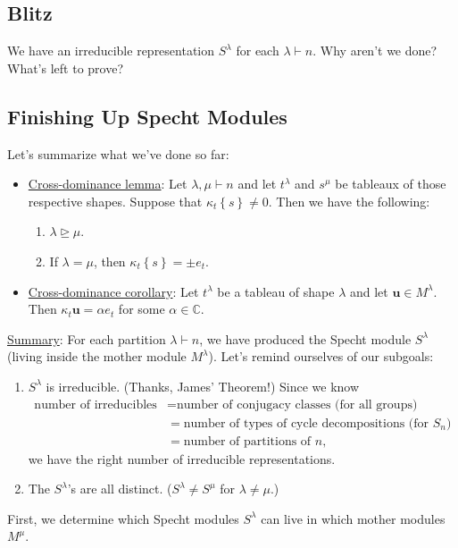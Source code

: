 \documentclass[12pt]{article}
\newcommand{\cx}{\mathbb{C}}
\newcommand\setb[1]{\left \{ #1 \right \}}
\theoremstyle{definition}
\begin{document}
\subsection{Blitz}
We have an irreducible representation $S^{\lambda}$ for each $\lambda \vdash n$. Why aren't we done? What's left to prove?
\subsection{Finishing Up Specht Modules}
Let's summarize what we've done so far:
\begin{itemize}
    \item \underline{Cross-dominance lemma}: Let $\lambda , \mu \vdash n$ and let $t^{\lambda}$ and $s^{\mu}$ be tableaux of those respective shapes. Suppose that $\kappa_t \setb{ s } \neq 0$. Then we have the following:
    \begin{enumerate}
        \item $\lambda \trianglerighteq \mu$.
        \item If $\lambda = \mu$, then $\kappa_t \setb{ s } = \pm e_t$.
    \end{enumerate}
    \item \underline{Cross-dominance corollary}: Let $t^{\lambda}$ be a tableau of shape $\lambda$ and let $\mathbf{u} \in M^{\lambda}$. Then $\kappa_t \mathbf{u} = \alpha e_t$ for some $\alpha \in \cx$.
\end{itemize}
\noindent \underline{Summary}: For each partition $\lambda \vdash n$, we have produced the Specht module $S^{\lambda}$ (living inside the mother module $M^{\lambda}$). Let's remind ourselves of our subgoals:
\begin{enumerate}
    \item $S^{\lambda}$ is irreducible. (Thanks, James' Theorem!) Since we know
    \begin{align*}
        \text{number of irreducibles} & = \text{number of conjugacy classes (for all groups)} \\
        & = \text{number of types of cycle decompositions (for $S_n$)} \\
        & = \text{number of partitions of $n$,}
    \end{align*}
    we have the right number of irreducible representations.
    \item The $S^{\lambda}$'s are all distinct. ($S^{\lambda} \neq S^{\mu}$ for $\lambda \neq \mu$.)
\end{enumerate}
First, we determine which Specht modules $S^{\lambda}$ can live in which mother modules $M^{\mu}$.
\end{document}
